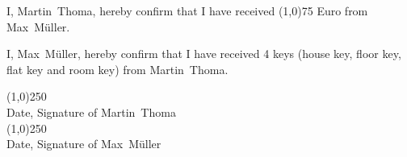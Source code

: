 \documentclass[a4paper]{scrartcl}
\newcommand{\HauptmieterVorname}{Martin}                            %
\newcommand{\HauptmieterNachname}{Thoma}                            %
\newcommand{\UntermieterVorname}{Max}                               %
\newcommand{\UntermieterNachname}{Müller}                           %
\begin{document}
I, \HauptmieterVorname~\HauptmieterNachname, hereby confirm that I have received \line(1,0){75}
Euro from \UntermieterVorname~\UntermieterNachname.

I, \UntermieterVorname~\UntermieterNachname, hereby confirm that I have received 4 keys (house key,
floor key, flat key and room key) from \HauptmieterVorname~\HauptmieterNachname.

\vspace{1.5cm}
\line(1,0){250}\\
\vspace{-0.3cm}
{\scriptsize Date, Signature of \HauptmieterVorname~\HauptmieterNachname}\\


\vspace{1cm}
\line(1,0){250}\\
\vspace{-0.3cm}
{\scriptsize Date, Signature of \UntermieterVorname~\UntermieterNachname}\\
\end{document}
